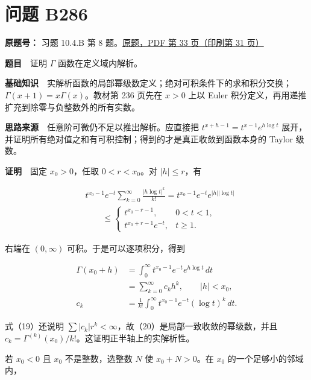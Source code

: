\documentclass[11pt,a4paper]{article}
\begin{document}
\section{问题 B286}\label{ux95eeux9898-b286}

\textbf{原题号：} 习题 10.4.B 第 8
题。\href{https://zj139.github.io/math-notes/files/problems/楼分析习题-v2.pdf\#page=33}{原题，PDF
第 33 页（印刷第 31 页）}

\textbf{题目}　证明 \(\Gamma\) 函数在定义域内解析。

\textbf{基础知识}　实解析函数的局部幂级数定义；绝对可积条件下的求和积分交换；\(\Gamma(x+1)=x\Gamma(x)\)。教材第
236 页先在 \(x>0\) 上以 Euler
积分定义，再用递推扩充到除零与负整数外的所有实数。

\textbf{思路来源}　任意阶可微仍不足以推出解析。应直接把
\(t^{x+h-1}=t^{x-1}e^{h\log t}\)
展开，并证明所有绝对值之和有可积控制；得到的才是真正收敛到函数本身的
Taylor 级数。

\textbf{证明}　固定 \(x_0>0\)，任取 \(0<r<x_0\)。对 \(|h|\le r\)，有

\begin{equation}
\begin{aligned}
&t^{x_0-1}e^{-t}\sum_{k=0}^\infty
\frac{|h\log t|^k}{k!}
=t^{x_0-1}e^{-t}e^{|h||\log t|}\\
&\qquad\le
\begin{cases}
t^{x_0-r-1},&0<t<1,\\
t^{x_0+r-1}e^{-t},&t\ge1.
\end{cases}
\end{aligned}
\tag{19}
\end{equation}

右端在 \((0,\infty)\) 可积。于是可以逐项积分，得到

\begin{equation}
\begin{aligned}
\Gamma(x_0+h)
&=\int_0^\infty t^{x_0-1}e^{-t}e^{h\log t}\,dt\\
&=\sum_{k=0}^\infty c_k h^k,\qquad |h|<x_0,\\
c_k&=\frac1{k!}\int_0^\infty t^{x_0-1}e^{-t}(\log t)^k\,dt.
\end{aligned}
\tag{20}
\end{equation}

式（19）还说明
\(\sum|c_k|r^k<\infty\)，故（20）是局部一致收敛的幂级数，并且
\(c_k=\Gamma^{(k)}(x_0)/k!\)。这证明正半轴上的实解析性。

若 \(x_0<0\) 且 \(x_0\) 不是整数，选整数 \(N\) 使 \(x_0+N>0\)。在
\(x_0\) 的一个足够小的邻域内，
\end{document}
